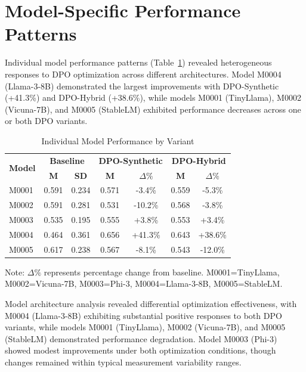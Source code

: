 \section{Model-Specific Performance Patterns}
\label{sec:model-specific-analysis}

Individual model performance patterns (Table~\ref{tab:model-specific}) revealed heterogeneous responses to DPO optimization across different architectures. Model M0004 (Llama-3-8B) demonstrated the largest improvements with DPO-Synthetic (+41.3\%) and DPO-Hybrid (+38.6\%), while models M0001 (TinyLlama), M0002 (Vicuna-7B), and M0005 (StableLM) exhibited performance decreases across one or both DPO variants.

\begin{table}[H]
\centering
\caption{Individual Model Performance by Variant}
\label{tab:model-specific}
\begin{tabular}{lcccccc}
\toprule
\multirow{2}{*}{\textbf{Model}} & \multicolumn{2}{c}{\textbf{Baseline}} & \multicolumn{2}{c}{\textbf{DPO-Synthetic}} & \multicolumn{2}{c}{\textbf{DPO-Hybrid}} \\
\cmidrule(lr){2-3} \cmidrule(lr){4-5} \cmidrule(lr){6-7}
& \textbf{M} & \textbf{SD} & \textbf{M} & \textbf{$\Delta\%$} & \textbf{M} & \textbf{$\Delta\%$} \\
\midrule
M0001 & 0.591 & 0.234 & 0.571 & -3.4\% & 0.559 & -5.3\% \\
M0002 & 0.591 & 0.281 & 0.531 & -10.2\% & 0.568 & -3.8\% \\
M0003 & 0.535 & 0.195 & 0.555 & +3.8\% & 0.553 & +3.4\% \\
M0004 & 0.464 & 0.361 & 0.656 & +41.3\% & 0.643 & +38.6\% \\
M0005 & 0.617 & 0.238 & 0.567 & -8.1\% & 0.543 & -12.0\% \\

\bottomrule
\end{tabular}
\begin{tablenotes}
\small
\item Note: $\Delta \%$ represents percentage change from baseline. M0001=TinyLlama, M0002=Vicuna-7B, M0003=Phi-3, M0004=Llama-3-8B, M0005=StableLM.
\end{tablenotes}
\end{table}

Model architecture analysis revealed differential optimization effectiveness, with M0004 (Llama-3-8B) exhibiting substantial positive responses to both DPO variants, while models M0001 (TinyLlama), M0002 (Vicuna-7B), and M0005 (StableLM) demonstrated performance degradation. Model M0003 (Phi-3) showed modest improvements under both optimization conditions, though changes remained within typical measurement variability ranges.

